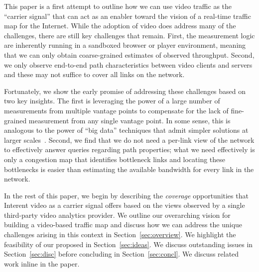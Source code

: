 This paper is a first attempt to outline how we can use video traffic as the
``carrier signal'' that can act as an enabler toward the vision of a real-time
traffic map for the Internet. While the adoption of video does address many of
the challenges, there are still key challenges that remain. First, the
measurement logic  are inherently running in a sandboxed browser or player
environment, meaning that we can only obtain coarse-grained estimates of
observed throughput. Second, we only observe end-to-end path characteristics
between video clients and servers and these may not suffice to cover all links
on the network. 


Fortunately, we show the early promise of addressing these challenges based 
 on two key insights. The first is leveraging the power of a large 
number of measurements from multiple vantage points to compensate for the lack 
of fine-grained measurement from any single vantage point. In some sense, 
 this is analogous to the power of ``big data'' techniques that admit 
 simpler solutions at larger scales~\cite{halevy2009unreasonable}. 
 Second, we find that we do not need a per-link view of the network to 
 effectively answer queries regarding path properties; what we need effectively 
 is only a congestion map that identifies bottleneck links and locating 
 these bottlenecks is easier than estimating the available 
 bandwidth for every link in the network.


In the rest of this paper, we begin by describing the {\em coverage}
opportunities that Interent video as a carrier signal offers based on the views
observed by a single third-party video analytics provider. We outline our
overarching vision for building a video-based traffic map and discuss how we
can address the unique challenges  arising in this context in
Section~\ref{sec:overview}. We  highlight the feasibility of our proposed  in
Section~\ref{sec:ideas}. We discuss outstanding issues in
Section~\ref{sec:disc} before concluding in Section~\ref{sec:concl}.
 We discuss related work inline in the paper.


